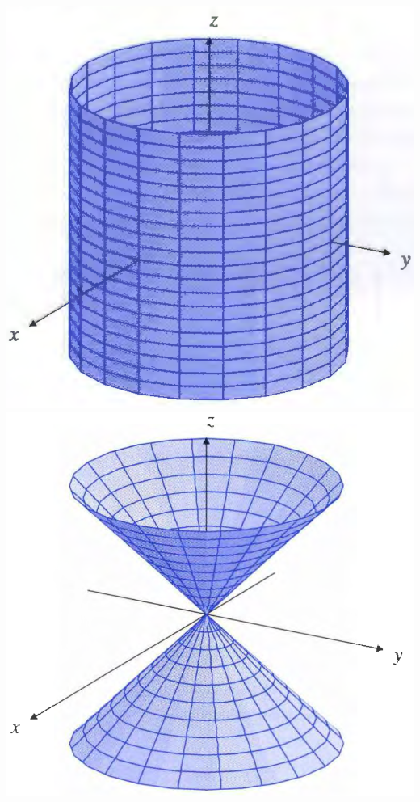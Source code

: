 \documentclass[11pt, a4paper]{MATH2023}
\begin{document}
\begin{spacing}{1.3}
    \begin{center}
        \includegraphics[scale=0.3]{images/Ch10-cylinder.png}
        \hspace{1in}
        \includegraphics[scale=0.3]{images/Ch10-cone.png}
    \end{center}
    


\end{spacing}
\end{document}
